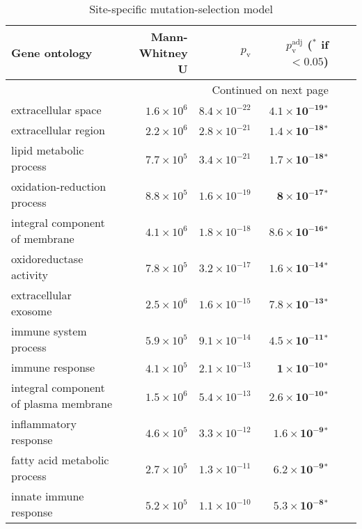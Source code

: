 \begin{longtable}{|l|r|r|r|r|r|}
    \caption{Site-specific mutation-selection model} \\
    \toprule
    Gene ontology                            & Mann-Whitney U     & $p_{\mathrm{v}}$     & $p_{\mathrm{v}}^{\mathrm{adj}}$ ($\bm{^*}$ if $ < 0.05$) \\
    \midrule
    \endhead
    \midrule
    \multicolumn{4}{r}{{Continued on next page}} \\
    \midrule
    \endfoot

    \bottomrule
    \endlastfoot
    extracellular space                      & $1.6\times 10^{6}$ & $8.4\times 10^{-22}$ & $\bm{4.1\times 10^{-19}{^*}}$   \\
    extracellular region                     & $2.2\times 10^{6}$ & $2.8\times 10^{-21}$ & $\bm{1.4\times 10^{-18}{^*}}$   \\
    lipid metabolic process                  & $7.7\times 10^{5}$ & $3.4\times 10^{-21}$ & $\bm{1.7\times 10^{-18}{^*}}$   \\
    oxidation-reduction process              & $8.8\times 10^{5}$ & $1.6\times 10^{-19}$ & $\bm{ 8\times 10^{-17}{^*}}$    \\
    integral component of membrane           & $4.1\times 10^{6}$ & $1.8\times 10^{-18}$ & $\bm{8.6\times 10^{-16}{^*}}$   \\
    oxidoreductase activity                  & $7.8\times 10^{5}$ & $3.2\times 10^{-17}$ & $\bm{1.6\times 10^{-14}{^*}}$   \\
    extracellular exosome                    & $2.5\times 10^{6}$ & $1.6\times 10^{-15}$ & $\bm{7.8\times 10^{-13}{^*}}$   \\
    immune system process                    & $5.9\times 10^{5}$ & $9.1\times 10^{-14}$ & $\bm{4.5\times 10^{-11}{^*}}$   \\
    immune response                          & $4.1\times 10^{5}$ & $2.1\times 10^{-13}$ & $\bm{ 1\times 10^{-10}{^*}}$    \\
    integral component of plasma membrane    & $1.5\times 10^{6}$ & $5.4\times 10^{-13}$ & $\bm{2.6\times 10^{-10}{^*}}$   \\
    inflammatory response                    & $4.6\times 10^{5}$ & $3.3\times 10^{-12}$ & $\bm{1.6\times 10^{-9}{^*}}$    \\
    fatty acid metabolic process             & $2.7\times 10^{5}$ & $1.3\times 10^{-11}$ & $\bm{6.2\times 10^{-9}{^*}}$    \\
    innate immune response                   & $5.2\times 10^{5}$ & $1.1\times 10^{-10}$ & $\bm{5.3\times 10^{-8}{^*}}$    \\

\end{longtable}
